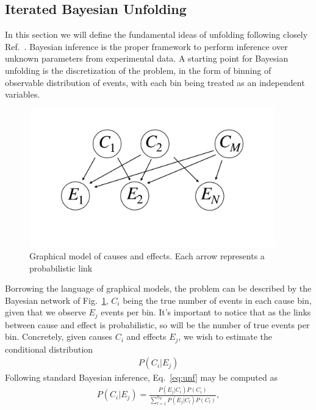 \subsection{Iterated Bayesian Unfolding}
In this section we will define the fundamental ideas of unfolding following closely Ref.~\cite{DAgostini:1994fjx, dagostini2010improved}.
Bayesian inference is the proper framework to perform inference over unknown parameters from experimental data. A starting point for Bayesian unfolding is the discretization of the problem, in the form of binning of observable distribution of events, with each bin being treated as an independent variables.
%
\begin{figure}[t]
\centering
\includegraphics[page = 1, width=0.95\textwidth]{./figures/graphical_model}
\caption{Graphical model of causes and effects. Each arrow represents a probabilistic link}
\label{fig:graph_model}
\end{figure}
%
Borrowing the language of graphical models, the problem can be described by the Bayesian network of Fig.~\ref{fig:graph_model}, $C_{i}$ being the true number of events in each cause bin, given that we observe $E_{j}$ events per bin.
It's important to notice that as the links between cause and effect is probabilistic, so will be the number of true events per bin. Concretely,  given causes $C_i$ and effects $E_j$, we wish to estimate the conditional distribution
%
\begin{align}\label{eq:unf}
P(C_i | E_j)
\end{align}
%
Following standard Bayesian inference, Eq.~\ref{eq:unf} may be computed as
%
\begin{align}\label{eq:bayes_inf}
P(C_i | E_j) = \frac{P(E_j | C_i) P(C_i)}{\sum_{l=1}^{n_E} P(E_j| C_l) P(C_l)},
\end{align}
